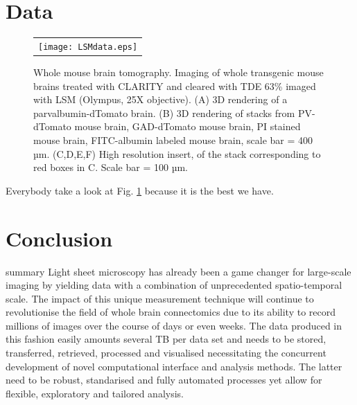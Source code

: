 \documentclass[12pt]{spieman}  %
\begin{document}
\section{Data}

	\begin{figure}
   \begin{center}
   \begin{tabular}{c}
   \texttt{[image: LSMdata.eps]}
   \end{tabular}
   \end{center}
   \caption{\label{fig:LSMdata} Whole mouse brain tomography. Imaging of whole transgenic mouse brains treated with CLARITY and cleared with TDE 63\% imaged with LSM (Olympus, 25X objective). (A) 3D rendering of a parvalbumin-dTomato brain. (B) 3D rendering of stacks from PV-dTomato mouse brain, GAD-dTomato mouse brain,  PI stained mouse brain, FITC-albumin labeled mouse brain, scale bar = 400 µm. (C,D,E,F) High resolution insert, of the stack corresponding to red boxes in C. Scale bar = 100 µm.} 
   \end{figure}
	
	Everybody take a look at Fig. \ref{fig:LSMdata} because it is the best we have. 

\section{Conclusion}
summary
Light sheet microscopy has already been a game changer for large-scale imaging by yielding data with a combination of unprecedented spatio-temporal scale. The impact of this unique measurement technique will continue to revolutionise the field of whole brain connectomics due to its ability to record millions of images over the course of days or even weeks. The data produced in this fashion easily amounts several TB per data set and needs to be stored, transferred, retrieved, processed and visualised necessitating the concurrent development of novel computational interface and analysis methods. The latter need to be robust, standarised and fully automated processes yet allow for flexible, exploratory and tailored analysis. 
\end{document}
